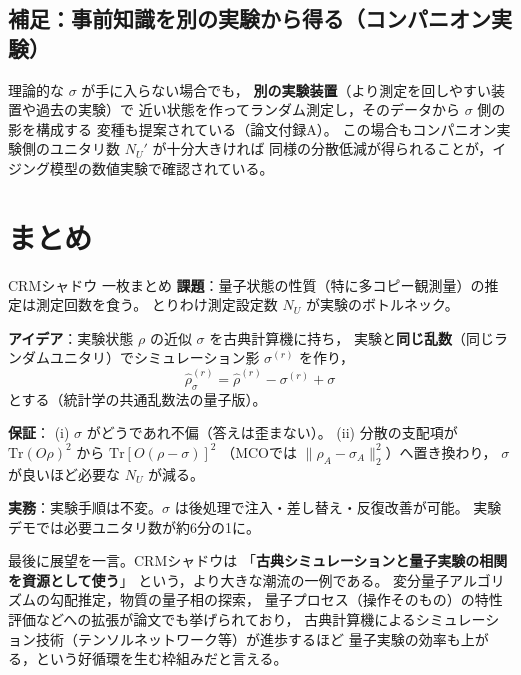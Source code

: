 \documentclass[11pt]{ltjsarticle}
\newcommand{\Tr}{\mathrm{Tr}}
\newcommand{\NU}{N_U}
\begin{document}
\subsection{補足：事前知識を別の実験から得る（コンパニオン実験）}

理論的な $\sigma$ が手に入らない場合でも，
\textbf{別の実験装置}（より測定を回しやすい装置や過去の実験）で
近い状態を作ってランダム測定し，そのデータから $\sigma$ 側の影を構成する
変種も提案されている（論文付録A）。
この場合もコンパニオン実験側のユニタリ数 $\NU'$ が十分大きければ
同様の分散低減が得られることが，イジング模型の数値実験で確認されている。

\section{まとめ}

\begin{pointbox}{CRMシャドウ 一枚まとめ}
\textbf{課題}：量子状態の性質（特に多コピー観測量）の推定は測定回数を食う。
とりわけ測定設定数 $\NU$ が実験のボトルネック。

\textbf{アイデア}：実験状態 $\rho$ の近似 $\sigma$ を古典計算機に持ち，
実験と\textbf{同じ乱数}（同じランダムユニタリ）でシミュレーション影 $\sigma^{(r)}$ を作り，
\[
  \hat\rho^{(r)}_\sigma = \hat\rho^{(r)} - \sigma^{(r)} + \sigma
\]
とする（統計学の共通乱数法の量子版）。

\textbf{保証}：
(i) $\sigma$ がどうであれ不偏（答えは歪まない）。
(ii) 分散の支配項が $\Tr(O\rho)^2$ から $\Tr[O(\rho-\sigma)]^2$
（MCOでは $\|\rho_A - \sigma_A\|_2^2$）へ置き換わり，
$\sigma$ が良いほど必要な $\NU$ が減る。

\textbf{実務}：実験手順は不変。$\sigma$ は後処理で注入・差し替え・反復改善が可能。
実験デモでは必要ユニタリ数が約6分の1に。
\end{pointbox}

最後に展望を一言。CRMシャドウは
「\textbf{古典シミュレーションと量子実験の相関を資源として使う}」
という，より大きな潮流の一例である。
変分量子アルゴリズムの勾配推定，物質の量子相の探索，
量子プロセス（操作そのもの）の特性評価などへの拡張が論文でも挙げられており，
古典計算機によるシミュレーション技術（テンソルネットワーク等）が進歩するほど
量子実験の効率も上がる，という好循環を生む枠組みだと言える。
\end{document}
